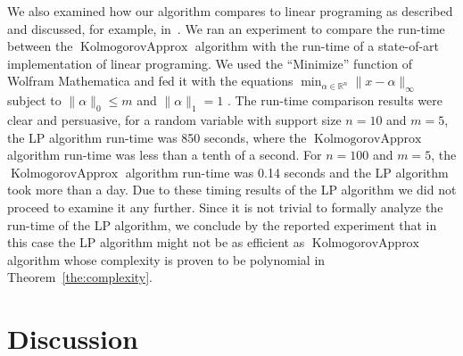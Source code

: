 \documentclass{article}
\DeclareMathOperator{\KlmApprox}{KolmogorovApprox}
\begin{document}
We also examined how our algorithm compares to linear programing as described and discussed, for example, in~\cite{pavlikov2016cvar}. We ran an experiment to compare the run-time between the $\KlmApprox$ algorithm with the run-time of a state-of-art implementation of linear programing. We used the ``Minimize'' function of Wolfram Mathematica and fed it with the equations $\min_{\alpha \in \mathbb{R}^n} \| x - \alpha\|_\infty$ subject to $\|\alpha\|_0 \leq m$ and $\| \alpha \|_1 =1$ . The run-time comparison results were clear and persuasive, for a random variable with support size $n=10$ and $m=5$, the LP algorithm run-time was 850 seconds, where the $\KlmApprox$ algorithm run-time was less than a tenth of a second. For $n=100$ and $m=5$, the $\KlmApprox$ algorithm run-time was 0.14 seconds and the LP algorithm took more than a day. Due to these timing results of the LP algorithm we did not proceed to examine it any further.
Since it is not trivial to formally analyze the run-time of the LP algorithm, we conclude by the reported experiment that in this case the LP algorithm might not be as efficient as $\KlmApprox$ algorithm whose complexity is proven to be polynomial in Theorem~\ref{the:complexity}.

\section{Discussion}\label{sec:discussion}


{}

\end{document}
